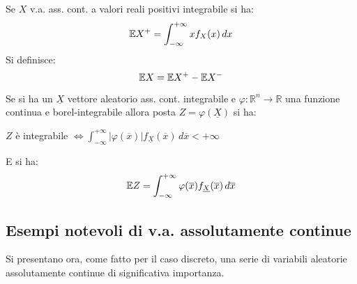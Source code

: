 \vspace{10px}

\begin{definition}
Se $X$ v.a. ass. cont. a valori reali positivi integrabile si ha:
\[\mathbb{E} X^+=\int_{-\infty}^{+\infty} xf_X(x) \,dx\]
\vspace{5px}
Si definisce: \[\mathbb{E} X = \mathbb{E} X^+ - \mathbb{E} X^-\]
\end{definition}


\vspace{15px}

\begin{observation}
Se si ha un $\underline{X}$ vettore aleatorio ass. cont. integrabile e $\varphi:\mathbb{R}^n\longrightarrow\mathbb{R}$ una funzione continua e borel-integrabile allora posta $Z=\varphi(\underline{X})$ si ha: 
\begin{center}
    $Z$ è integrabile $\Longleftrightarrow \int_{-\infty}^{+\infty} |\varphi(\overline{x})|f_{\underline{X}}(\overline{x}) \,d\overline{x} < +\infty $
\end{center}
E si ha: \[\mathbb{E} Z = \int_{-\infty}^{+\infty} \varphi(\overline{x})f_{\underline{X}}(\overline{x}) \,d\overline{x}\]
\end{observation}

\newpage

\subsection{Esempi notevoli di v.a. assolutamente continue}

\vspace{5px}

Si presentano ora, come fatto per il caso discreto, una serie di variabili aleatorie assolutamente continue di significativa importanza.

\vspace{5px}


